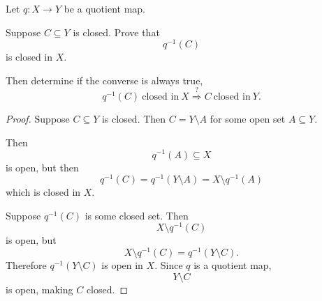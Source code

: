\documentclass[11pt]{article}
\begin{document}
\begin{prob}
    Let $q : X \to Y$ be a quotient map. 

    Suppose $C \subseteq Y$ is closed. 
    Prove that 
    \[
        q^{-1}(C)
    \]
    is closed in $X$. 

    Then determine if the converse is always true, 
    \[
        q^{-1}(C) \ \text{closed in} \ X 
        \overset{\text{?}}\Rightarrow C \ \text{closed in} \ Y. 
    \]
\end{prob}
\begin{proof}
    Suppose $C \subseteq Y$ is closed. 
    Then $C = Y \setminus A$ for some open set 
    $A \subseteq Y$. 

    Then 
    \[
        q^{-1}(A) \subseteq X 
    \]
    is open, but then 
    \[
        q^{-1}(C) = q^{-1}(Y \setminus A) 
        = X \setminus q^{-1}(A)  
    \]
    which is closed in $X$. 

    Suppose $q^{-1}(C)$ is some closed set. 
    Then 
    \[
        X \setminus q^{-1}(C)
    \]
    is open, 
    but 
    \[
        X \setminus q^{-1}(C) 
        = q^{-1}(Y \setminus C). 
    \]
    Therefore $q^{-1}(Y \setminus C)$ is 
    open in $X$. Since $q$ is a quotient map, 
    \[
        Y \setminus C
    \] 
    is open, making $C$ closed. 
    
\end{proof}
\end{document}
